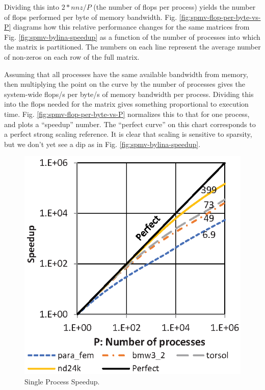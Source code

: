 Dividing this into $2*nnz/P$ (the number of flops per process) yields the number of flops performed per byte of memory bandwidth. Fig. \ref{fig:spmv-flop-per-byte-vs-P} diagrams how this relative performance changes for the same matrices from Fig. \ref{fig:spmv-bylina-speedup} as a function of the number of processes into which the matrix is partitioned. The numbers on each line represent the average number of non-zeros on each row of the full matrix.


Assuming that all processes have the same available bandwidth from memory, then multiplying the point on the curve by the number of processes gives the system-wide flops/s per byte/s of memory bandwidth per process. Dividing this into the flops needed for the matrix gives something proportional to execution time. Fig. \ref{fig:spmv-flop-per-byte-vs-P} normalizes this to that for one process, and plots a ``speedup'' number. The ``perfect curve'' on this chart corresponds to a perfect strong scaling reference. It is clear that scaling is sensitive to sparsity, but we don't yet see a dip as in Fig.  \ref{fig:spmv-bylina-speedup}.

\begin{figure}\begin{centering}
\includegraphics[scale=0.75]{figures/spmv-partial-speedup.eps}
\caption{Single Process Speedup.}
\label{fig:spmv-partial-speedup}
\end{centering}\end{figure}

